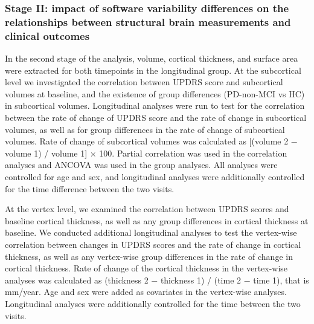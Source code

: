 \documentclass[11pt]{article}
\begin{document}
\subsubsection*{Stage II: impact of software variability differences on the relationships between structural brain measurements and clinical outcomes}

In the second stage of the analysis, volume, cortical thickness, and surface area were extracted for both
timepoints in the longitudinal group. At the subcortical level we investigated the correlation between UPDRS score
and subcortical volumes at baseline, and the existence of group differences (PD-non-MCI vs HC) in subcortical
volumes. Longitudinal analyses were run to test for the correlation between the rate of change of UPDRS score and
the rate of change in subcortical volumes, as well as for group differences in the rate of change of subcortical
volumes. Rate of change of subcortical volumes was calculated as [(volume 2 $-$ volume 1) / volume 1] $\times$ 100.
Partial correlation was used in the correlation analyses and ANCOVA was used in the group analyses. All analyses
were controlled for age and sex, and longitudinal analyses were additionally controlled for the time difference
between the two visits. 

At the vertex level, we examined the correlation between UPDRS scores and baseline cortical thickness, as well as
any group differences in cortical thickness at baseline. We conducted additional longitudinal analyses to test the
vertex-wise correlation between changes in UPDRS scores and the rate of change in cortical thickness, as well as
any vertex-wise group differences in the rate of change in cortical thickness. Rate of change of the cortical
thickness in the vertex-wise analyses was calculated as (thickness 2 $-$ thickness 1) / (time 2 $-$ time 1), that
is mm/year. Age and sex were added as covariates in the vertex-wise analyses. Longitudinal analyses were
additionally controlled for the time between the two visits.  
\end{document}
